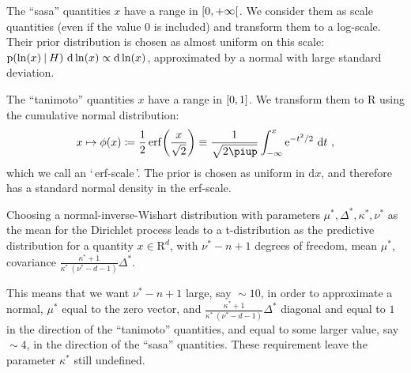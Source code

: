 \documentclass[\ifafour a4paper,12pt,\else a5paper,10pt,\fi%
onecolumn,oneside,article,%
british%
]{memoir}
\newcommand*{\defquote}[1]{`\,#1\,'}
\theoremstyle{remark}
\theoremstyle{innote}
\renewcommand*{\finalnamedelim}{\addspace\amp\space}
\newcommand*{\amp}{\&}
\newcommand*{\pu}{\piup}%
\newcommand*{\e}{\mathrm{e}}%
\newcommand*{\di}{\mathrm{d}}%
\newcommand*{\RR}{\bm{\mathrm{R}}}
\newcommand*{\defd}{\coloneqq}
\DeclarePairedDelimiter\clcl{[}{]}
\DeclarePairedDelimiter\clop{[}{[}
\newcommand*{\p}{\mathrm{p}}%
\renewcommand*{\|}[1][]{\nonscript\:#1\vert\nonscript\:\mathopen{}}
\renewcommand*{\=}{\TextOrMath\texteq\eq}
\begin{document}
The \enquote{sasa} quantities $x$ have a range in $\clop{0,+\infty}$. We
consider them as scale quantities (even if the value $0$ is included) and
transform them to a log-scale. Their prior distribution is chosen as
almost uniform on this scale:
$\p(\ln(x) \| H)\ \di\ln(x) \propto \di\ln(x)$, approximated by a normal
with large standard deviation.

The \enquote{tanimoto} quantities $x$ have a range in $\clcl{0,1}$. We
transform them to $\RR$ using the cumulative normal distribution:
\begin{equation}
  \label{eq:transf_tanimoto}
  x \mapsto \phi(x) \defd
  \frac{1}{2}\operatorname{erf}\biggl(\frac{x}{\sqrt{2}}\biggr)
  \equiv \frac{1}{\sqrt{2\pu}}\int_{-\infty}^{x} \e^{-t^{2}/2}\ \di t \ ,
\end{equation}
which we call an \defquote{erf-scale}.
The prior is chosen as uniform in $\di x$, and therefore has a standard
normal density in the erf-scale.

Choosing a normal-inverse-Wishart distribution with parameters
$\mu^{*}, \varDelta^{*}, \kappa^{*}, \nu^{*}$ as the mean for the Dirichlet
process leads to a t-distribution as the predictive distribution for a
quantity $x \in \RR^{d}$, with $\nu^{*}-n+1$ degrees of freedom, mean
$\mu^{*}$, covariance
$\frac{\kappa^{*}+1}{\kappa^{*}\ (\nu^{*}-d-1)}\varDelta^{*}$.

This means that we want $\nu^{*}-n+1$ large, say ${}\sim 10$, in order to
approximate a normal, $\mu^{*}$ equal to the zero vector, and
$\frac{\kappa^{*}+1}{\kappa^{*}\ (\nu^{*}-d-1)}\varDelta^{*}$ diagonal and
equal to $1$ in the direction of the \enquote{tanimoto} quantities, and
equal to some larger value, say ${}\sim 4$, in the direction of the \enquote{sasa}
quantities. These requirement leave the parameter $\kappa^{*}$ still undefined.



\renewcommand*{\finalnamedelim}{\addcomma\space}

\printbibliography[prenote=prenote%
]
\end{document}
